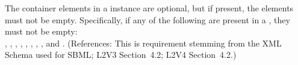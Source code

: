 The  container elements in a \Model instance are optional,
but if present, the elements must not be empty.  Specifically, if
any of the following are present in a \Model, they must not be empty:\\
,
,
, 
,
,
,
,
,
 and .  (References:
This is requirement stemming from the XML Schema used for SBML;
L2V3 Section~4.2; L2V4 Section~4.2.)
